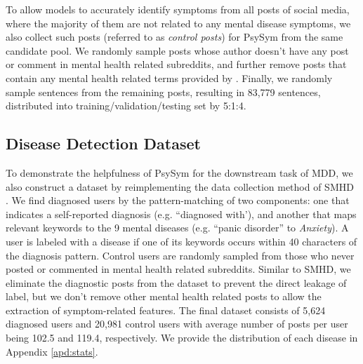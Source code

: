 To allow models to accurately identify symptoms from all posts of social media, where the majority of them are not related to any mental disease symptoms, we also collect such posts (referred to as \textit{control posts}) for PsySym from the same candidate pool. We randomly sample posts whose author doesn't have any post or comment in mental health related subreddits, and further remove posts that contain any mental health related terms provided by \citet{cohan2018smhd}. Finally, we randomly sample sentences from the remaining posts, resulting in 83,779 sentences, distributed into training/validation/testing set by 5:1:4.

\subsection{Disease Detection Dataset}
\label{sec:data_disease}

To demonstrate the helpfulness of PsySym for the downstream task of MDD, we also construct a dataset by reimplementing the data collection method of SMHD \citep{cohan2018smhd}. We find diagnosed users by the pattern-matching of two components: one that indicates a self-reported diagnosis (e.g. ``diagnosed with'), and another that maps relevant keywords to the 9 mental diseases (e.g. ``panic disorder'' to \textit{Anxiety}). A user is labeled with a disease if one of its keywords occurs within 40 characters of the diagnosis pattern. Control users are randomly sampled from those who never posted or commented in mental health related subreddits. Similar to SMHD, we eliminate the diagnostic posts from the dataset to prevent the direct leakage of label, but we don't remove other mental health related posts to allow the extraction of symptom-related features. The final dataset consists of 5,624 diagnosed users and 20,981 control users with average number of posts per user being 102.5 and 119.4, respectively. We provide the distribution of each disease in Appendix \ref{apd:stats}. 
